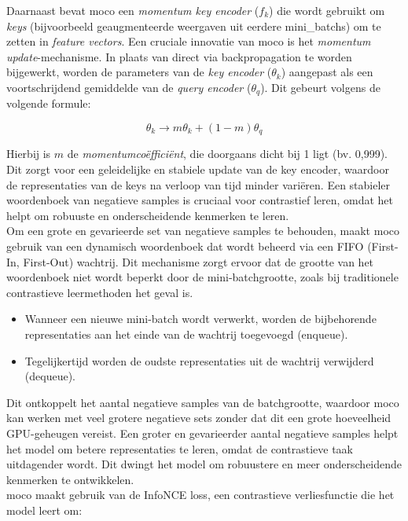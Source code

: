 Daarnaast bevat \gls{moco} een \emph{momentum key encoder} ($f_k$) die wordt gebruikt om \emph{keys} (bijvoorbeeld geaugmenteerde weergaven uit eerdere \glspl{mini_batch}) om te zetten in \emph{feature vectors}. Een cruciale innovatie van \gls{moco} is het \emph{momentum update}-mechanisme. In plaats van direct via backpropagation te worden bijgewerkt, worden de parameters van de \emph{key encoder} ($\theta_k$) aangepast als een voortschrijdend gemiddelde van de \emph{query encoder} ($\theta_q$). Dit gebeurt volgens de volgende formule:

$$
\theta_k \rightarrow m\theta_k + (1 - m)\theta_q
$$

Hierbij is $m$ de \emph{momentumcoëfficiënt}, die doorgaans dicht bij 1 ligt (bv. 0,999). Dit zorgt voor een geleidelijke en stabiele update van de key encoder, waardoor de representaties van de keys na verloop van tijd minder variëren. Een stabieler woordenboek van negatieve samples is cruciaal voor contrastief leren, omdat het helpt om robuuste en onderscheidende kenmerken te leren. \\

Om een grote en gevarieerde set van negatieve samples te behouden, maakt \gls{moco} gebruik van een dynamisch woordenboek dat wordt beheerd via een FIFO (First-In, First-Out) wachtrij. Dit mechanisme zorgt ervoor dat de grootte van het woordenboek niet wordt beperkt door de mini-batchgrootte, zoals bij traditionele contrastieve leermethoden het geval is.

\begin{itemize}
    \item Wanneer een nieuwe mini-batch wordt verwerkt, worden de bijbehorende representaties aan het einde van de wachtrij toegevoegd (enqueue).
    \item Tegelijkertijd worden de oudste representaties uit de wachtrij verwijderd (dequeue).
\end{itemize}

Dit ontkoppelt het aantal negatieve samples van de batchgrootte, waardoor \gls{moco} kan werken met veel grotere negatieve sets zonder dat dit een grote hoeveelheid GPU-geheugen vereist. Een groter en gevarieerder aantal negatieve samples helpt het model om betere representaties te leren, omdat de contrastieve taak uitdagender wordt. Dit dwingt het model om robuustere en meer onderscheidende kenmerken te ontwikkelen. \\

\gls{moco} maakt gebruik van de InfoNCE loss, een contrastieve verliesfunctie die het model leert om:

